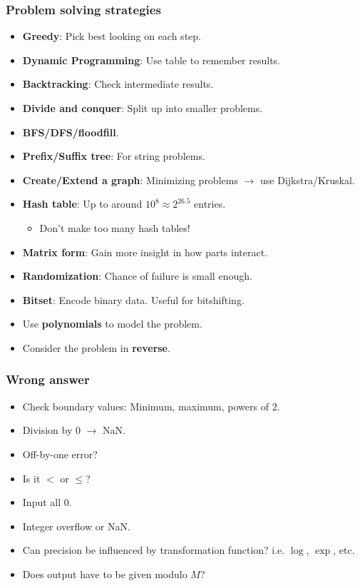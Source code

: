 \subsubsection{Problem solving strategies}
\begin{itemize}
    \item \textbf{Greedy}: Pick best looking on each step.
    \item \textbf{Dynamic Programming}: Use table to remember results.
    \item \textbf{Backtracking}: Check intermediate results.
    \item \textbf{Divide and conquer}: Split up into smaller problems.
    \item \textbf{BFS/DFS/floodfill}.
    \item \textbf{Prefix/Suffix tree}: For string problems.
    \item \textbf{Create/Extend a graph}: Minimizing problems $\rightarrow$ use Dijkstra/Kruskal.
    \item \textbf{Hash table}: Up to around $10^8 \approx 2^{26.5}$ entries.
    \begin{itemize}
        \item Don't make too many hash tables!
    \end{itemize}
    \item \textbf{Matrix form}: Gain more insight in how parts interact.
    \item \textbf{Randomization}: Chance of failure is small enough.
    \item \textbf{Bitset}: Encode binary data. Useful for bitshifting.
    \item Use \textbf{polynomials} to model the problem.
    \item Consider the problem in \textbf{reverse}.
\end{itemize}

\subsubsection{Wrong answer}
\begin{itemize}
    \item Check boundary values: Minimum, maximum, powers of $2$.
    \item Division by $0$ $\rightarrow$ NaN.
    \item Off-by-one error?
    \item Is it $<$ or $\leq$?
    \item Input all $0$.
    \item Integer overflow or NaN.
    \item Can precision be influenced by transformation function? i.e. $\log$, $\exp$, etc.
    \item Does output have to be given modulo $M$?
\end{itemize}

